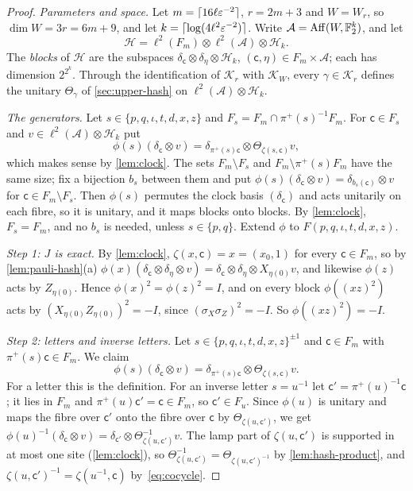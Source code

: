 \begin{proof}
\emph{Parameters and space.} Let $m=\lceil16\ell\varepsilon^{-2}\rceil$, $r=2m+3$ and $W=W_r$, so $\dim W=3r=6m+9$, and let
$k=\lceil\log(4\ell^2\varepsilon^{-2})\rceil$. Write $\mathcal A=\operatorname{Aff}(W,\mathbb F_2^k)$, and let
\[
\mathcal H=\ell^2(F_m)\otimes\ell^2(\mathcal A)\otimes\mathcal H_k .
\]
The \emph{blocks} of $\mathcal H$ are the subspaces $\delta_{\mathsf c}\otimes\delta_\eta\otimes\mathcal H_k$, $(\mathsf c,\eta)\in
F_m\times\mathcal A$; each has dimension $2^{2^k}$. Through the identification of $\mathcal K_r$ with $\mathcal K_W$, every
$\gamma\in\mathcal K_r$ defines the unitary $\Theta_\gamma$ of \cref{sec:upper-hash} on $\ell^2(\mathcal A)\otimes\mathcal H_k$.

\emph{The generators.} Let $s\in\{p,q,\iota,t,d,x,z\}$ and $F_s=F_m\cap\pi^+(s)^{-1}F_m$. For $\mathsf c\in F_s$ and
$v\in\ell^2(\mathcal A)\otimes\mathcal H_k$ put
\[
\phi(s)(\delta_{\mathsf c}\otimes v)=\delta_{\pi^+(s)\mathsf c}\otimes\Theta_{\zeta(s,\mathsf c)}v ,
\]
which makes sense by \cref{lem:clock}. The sets $F_m\setminus F_s$ and $F_m\setminus\pi^+(s)F_m$ have the same size; fix a bijection
$b_s$ between them and put $\phi(s)(\delta_{\mathsf c}\otimes v)=\delta_{b_s(\mathsf c)}\otimes v$ for $\mathsf c\in F_m\setminus F_s$. Then
$\phi(s)$ permutes the clock basis $(\delta_{\mathsf c})$ and acts unitarily on each fibre, so it is unitary, and it maps blocks onto blocks.
By \cref{lem:clock}, $F_s=F_m$, and no $b_s$ is needed, unless $s\in\{p,q\}$. Extend $\phi$ to $F(p,q,\iota,t,d,x,z)$.

\emph{Step 1: $J$ is exact.} By \cref{lem:clock}, $\zeta(x,\mathsf c)=x=(x_0,1)$ for every $\mathsf c\in F_m$, so by
\cref{lem:pauli-hash}(a) $\phi(x)(\delta_{\mathsf c}\otimes\delta_\eta\otimes v)=\delta_{\mathsf c}\otimes\delta_\eta\otimes X_{\eta(0)}v$, and
likewise $\phi(z)$ acts by $Z_{\eta(0)}$. Hence $\phi(x)^2=\phi(z)^2=I$, and on every block $\phi((xz)^2)$ acts by
$(X_{\eta(0)}Z_{\eta(0)})^2=-I$, since $(\sigma_X\sigma_Z)^2=-I$. So $\phi((xz)^2)=-I$.

\emph{Step 2: letters and inverse letters.} Let $s\in\{p,q,\iota,t,d,x,z\}^{\pm1}$ and $\mathsf c\in F_m$ with $\pi^+(s)\mathsf c\in F_m$. We
claim
\begin{equation}\label{eq:upper-letter}
\phi(s)(\delta_{\mathsf c}\otimes v)=\delta_{\pi^+(s)\mathsf c}\otimes\Theta_{\zeta(s,\mathsf c)}v .
\end{equation}
For a letter this is the definition. For an inverse letter $s=u^{-1}$ let $\mathsf c'=\pi^+(u)^{-1}\mathsf c$; it lies in $F_m$ and
$\pi^+(u)\mathsf c'=\mathsf c\in F_m$, so $\mathsf c'\in F_u$. Since $\phi(u)$ is unitary and maps the fibre over $\mathsf c'$ onto the fibre
over $\mathsf c$ by $\Theta_{\zeta(u,\mathsf c')}$, we get $\phi(u)^{-1}(\delta_{\mathsf c}\otimes v)=\delta_{\mathsf
c'}\otimes\Theta_{\zeta(u,\mathsf c')}^{-1}v$. The lamp part of $\zeta(u,\mathsf c')$ is supported in at most one site (\cref{lem:clock}),
so $\Theta_{\zeta(u,\mathsf c')}^{-1}=\Theta_{\zeta(u,\mathsf c')^{-1}}$ by \cref{lem:hash-product}, and $\zeta(u,\mathsf
c')^{-1}=\zeta(u^{-1},\mathsf c)$ by~\eqref{eq:cocycle}.


\end{proof}
